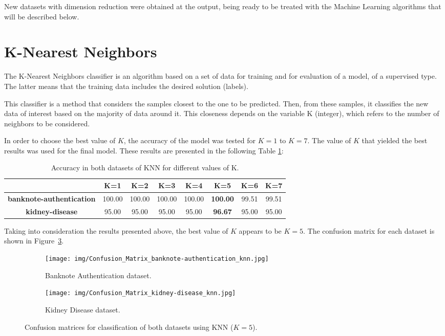 \documentclass[11pt,a4paper]{article}
\begin{document}
New datasets with dimension reduction were obtained at the output, being ready to be treated with the Machine Learning algorithms that will be described below.

\section{K-Nearest Neighbors}

The K-Nearest Neighbors classifier is an algorithm based on a set of data for training and for evaluation of a model, of a supervised type. The latter means that the training data includes the desired solution (labels).

This classifier is a method that considers the samples closest to the one to be predicted. Then, from these samples, it classifies the new data of interest based on the majority of data around it. This closeness depends on the variable K (integer), which refers to the number of neighbors to be considered.

In order to choose the best value of $K$, the accuracy of the model was tested for $K=1$ to $K=7$. The value of $K$ that yielded the best results was used for the final model. These results are presented in the following Table \ref{tab:knn_chose_k}:

\begin{table}[h!]
    \centering
    \begin{tabular}{|c|c|c|c|c|c|c|c|}
    \hline
    \bf & \bf K=1  & \bf K=2  & \bf K=3  & \bf K=4  & \bf K=5 & \bf K=6 & \bf K=7 \\\hline
    \bf banknote-authentication  & 100.00 & 100.00 & 100.00  & 100.00   & \bf 100.00 & 99.51 & 99.51 \\\hline
    \bf kidney-disease & 95.00 & 95.00 & 95.00 & 95.00 & \bf 96.67 & 95.00 & 95.00\\\hline
    \end{tabular}
    \caption{Accuracy in both datasets of KNN for different values of K.}
    \label{tab:knn_chose_k}
\end{table}

Taking into consideration the results presented above, the best value of $K$ appears to be $K=5$. The confusion matrix for each dataset is shown in Figure~\ref{cm_knn}.

\begin{figure}[H]
\centering
\begin{subfigure}{.5\textwidth}
  \centering
  \texttt{[image: img/Confusion\_Matrix\_banknote-authentication\_knn.jpg]}
  \caption{Banknote Authentication dataset.}
  \label{fig:sub1}
\end{subfigure}%
\begin{subfigure}{.5\textwidth}
  \centering
  \texttt{[image: img/Confusion\_Matrix\_kidney-disease\_knn.jpg]}
  \caption{Kidney Disease dataset.}
  \label{fig:sub2}
\end{subfigure}
\caption{Confusion matrices for classification of both datasets using KNN ($K=5$).}
\label{cm_knn}
\end{figure}
\end{document}
